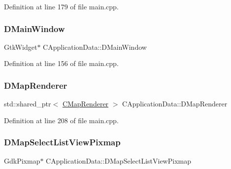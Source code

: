 Definition at line 179 of file main.\+cpp.

\hypertarget{classCApplicationData_af3c57a84b4ecca8a7f86b67a0ae55372}{}\label{classCApplicationData_af3c57a84b4ecca8a7f86b67a0ae55372} 
\subsubsection{\texorpdfstring{D\+Main\+Window}{DMainWindow}}
{\footnotesize\ttfamily Gtk\+Widget$\ast$ C\+Application\+Data\+::\+D\+Main\+Window\hspace{0.3cm}{\ttfamily [protected]}}



Definition at line 156 of file main.\+cpp.

\hypertarget{classCApplicationData_afaf62b458bd7a0ec93ab9f063d7ea8d7}{}\label{classCApplicationData_afaf62b458bd7a0ec93ab9f063d7ea8d7} 
\subsubsection{\texorpdfstring{D\+Map\+Renderer}{DMapRenderer}}
{\footnotesize\ttfamily std\+::shared\+\_\+ptr$<$ \hyperlink{classCMapRenderer}{C\+Map\+Renderer} $>$ C\+Application\+Data\+::\+D\+Map\+Renderer\hspace{0.3cm}{\ttfamily [protected]}}



Definition at line 208 of file main.\+cpp.

\hypertarget{classCApplicationData_a76e4af228d69ca3c6b1cf0770ca2e7a0}{}\label{classCApplicationData_a76e4af228d69ca3c6b1cf0770ca2e7a0} 
\subsubsection{\texorpdfstring{D\+Map\+Select\+List\+View\+Pixmap}{DMapSelectListViewPixmap}}
{\footnotesize\ttfamily Gdk\+Pixmap$\ast$ C\+Application\+Data\+::\+D\+Map\+Select\+List\+View\+Pixmap\hspace{0.3cm}{\ttfamily [protected]}}



